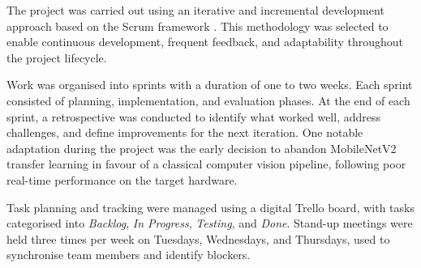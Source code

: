 
The project was carried out using an iterative and incremental development approach 
based on the Scrum framework \cite{schwaber2020scrum}. This methodology was selected to enable continuous 
development, frequent feedback, and adaptability throughout the project lifecycle.

Work was organised into sprints with a duration of one to two weeks. Each sprint 
consisted of planning, implementation, and evaluation phases. At the end of each 
sprint, a retrospective was conducted to identify what worked well, address 
challenges, and define improvements for the next iteration. One notable adaptation 
during the project was the early decision to abandon MobileNetV2 transfer learning 
in favour of a classical computer vision pipeline, following poor real-time 
performance on the target hardware.

Task planning and tracking were managed using a digital Trello board, with tasks 
categorised into \textit{Backlog}, \textit{In Progress}, \textit{Testing}, and 
\textit{Done}. Stand-up meetings were held three times per week on Tuesdays, 
Wednesdays, and Thursdays, used to synchronise team members and identify blockers.